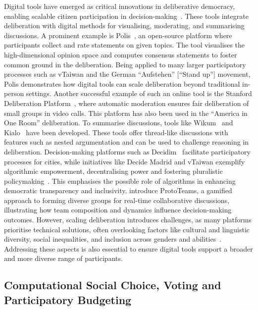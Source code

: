 Digital tools have emerged as critical innovations in deliberative democracy, enabling scalable citizen participation in decision-making~\cite{klein_towards_2017,davies_online_2020,mikhaylovskaya_enhancing_2024}. These tools integrate deliberation with digital methods for visualising, moderating, and summarising discussions. A prominent example is Polis~\cite{small2021}, an open-source platform where participants collect and rate statements on given topics. The tool visualises the high-dimensional opinion space and computes consensus statements to foster common ground in the deliberation. Being applied to many larger participatory processes such as vTaiwan and the German \enquote{Aufstehen} [\enquote{Stand up}] movement, Polis demonstrates how digital tools can scale deliberation beyond traditional in-person settings. Another successful example of such an online tool is the Stanford Deliberation Platform~\cite{fishkin_deliberative_2019}, where automatic moderation ensures fair deliberation of small groups in video calls. This platform has also been used in the \enquote{America in One Room} deliberation. To summarise discussions, tools like Wikum~\cite{zhang_wikum_2017} and Kialo~\cite{chaudoin_revolutionizing_2017} have been developed.  These tools offer thread-like discussions with features such as nested argumentation and can be used to challenge reasoning in deliberation. Decision-making platforms such as Decidim~\cite{aragon_deliberative_2017} facilitate participatory processes for cities, while initiatives like Decide Madrid and vTaiwan exemplify algorithmic empowerment, decentralising power and fostering pluralistic policymaking~\cite{tseng2022}. This emphasises the possible role of algorithms in enhancing democratic transparency and inclusivity. \citet{umbelino2021} introduce ProtoTeams, a gamified approach to forming diverse groups for real-time collaborative discussions, illustrating how team composition and dynamics influence decision-making outcomes. However, scaling deliberation introduces challenges, as many platforms prioritise technical solutions, often overlooking factors like cultural and linguistic diversity, social inequalities, and inclusion across genders and abilities~\cite{shortall_reason_2022}. Addressing these aspects is also essential to ensure digital tools support a broader and more diverse range of participants.

\subsection{Computational Social Choice, Voting and Participatory Budgeting}

